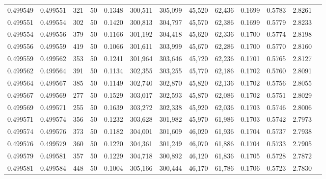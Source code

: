 \begin{tabular}{rrrrrrrrrrrrr}
0.499549 & 0.499551 & 321 &  50 &                                     0.1348 & 300,511 & 305,099 &  45,520 &  62,436 & 0.1699 & 0.5783 & 2.8261 \\
0.499551 & 0.499554 & 302 &  50 &                                     0.1420 & 300,813 & 304,797 &  45,570 &  62,386 & 0.1699 & 0.5779 & 2.8233 \\
0.499554 & 0.499556 & 379 &  50 &                                     0.1166 & 301,192 & 304,418 &  45,620 &  62,336 & 0.1700 & 0.5774 & 2.8198 \\
0.499556 & 0.499559 & 419 &  50 &                                     0.1066 & 301,611 & 303,999 &  45,670 &  62,286 & 0.1700 & 0.5770 & 2.8160 \\
0.499559 & 0.499562 & 353 &  50 &                                     0.1241 & 301,964 & 303,646 &  45,720 &  62,236 & 0.1701 & 0.5765 & 2.8127 \\
0.499562 & 0.499564 & 391 &  50 &                                     0.1134 & 302,355 & 303,255 &  45,770 &  62,186 & 0.1702 & 0.5760 & 2.8091 \\
0.499564 & 0.499567 & 385 &  50 &                                     0.1149 & 302,740 & 302,870 &  45,820 &  62,136 & 0.1702 & 0.5756 & 2.8055 \\
0.499567 & 0.499569 & 277 &  50 &                                     0.1529 & 303,017 & 302,593 &  45,870 &  62,086 & 0.1702 & 0.5751 & 2.8029 \\
0.499569 & 0.499571 & 255 &  50 &                                     0.1639 & 303,272 & 302,338 &  45,920 &  62,036 & 0.1703 & 0.5746 & 2.8006 \\
0.499571 & 0.499574 & 356 &  50 &                                     0.1232 & 303,628 & 301,982 &  45,970 &  61,986 & 0.1703 & 0.5742 & 2.7973 \\
0.499574 & 0.499576 & 373 &  50 &                                     0.1182 & 304,001 & 301,609 &  46,020 &  61,936 & 0.1704 & 0.5737 & 2.7938 \\
0.499576 & 0.499579 & 360 &  50 &                                     0.1220 & 304,361 & 301,249 &  46,070 &  61,886 & 0.1704 & 0.5733 & 2.7905 \\
0.499579 & 0.499581 & 357 &  50 &                                     0.1229 & 304,718 & 300,892 &  46,120 &  61,836 & 0.1705 & 0.5728 & 2.7872 \\
0.499581 & 0.499584 & 448 &  50 &                                     0.1004 & 305,166 & 300,444 &  46,170 &  61,786 & 0.1706 & 0.5723 & 2.7830 \\

\end{tabular}
